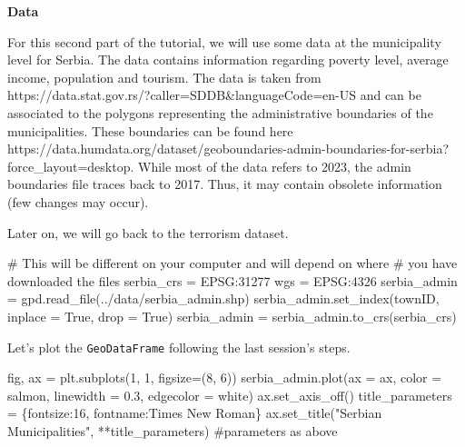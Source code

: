 \documentclass[
  letterpaper,
  DIV=11,
  numbers=noendperiod]{scrreprt}
\newenvironment{Shaded}{\begin{snugshade}}{\end{snugshade}}
\newcommand{\CommentTok}[1]{\textcolor[rgb]{0.37,0.37,0.37}{#1}}
\newcommand{\DecValTok}[1]{\textcolor[rgb]{0.68,0.00,0.00}{#1}}
\newcommand{\FloatTok}[1]{\textcolor[rgb]{0.68,0.00,0.00}{#1}}
\newcommand{\NormalTok}[1]{\textcolor[rgb]{0.00,0.23,0.31}{#1}}
\newcommand{\OperatorTok}[1]{\textcolor[rgb]{0.37,0.37,0.37}{#1}}
\newcommand{\StringTok}[1]{\textcolor[rgb]{0.13,0.47,0.30}{#1}}
\newcommand{\VariableTok}[1]{\textcolor[rgb]{0.07,0.07,0.07}{#1}}
\begin{document}
\textbf{Data}

For this second part of the tutorial, we will use some data at the
municipality level for Serbia. The data contains information regarding
poverty level, average income, population and tourism. The data is taken
from https://data.stat.gov.rs/?caller=SDDB\&languageCode=en-US and can
be associated to the polygons representing the administrative boundaries
of the municipalities. These boundaries can be found here
https://data.humdata.org/dataset/geoboundaries-admin-boundaries-for-serbia?force\_layout=desktop.
While most of the data refers to 2023, the admin boundaries file traces
back to 2017. Thus, it may contain obsolete information (few changes may
occur).

Later on, we will go back to the terrorism dataset.

\begin{Shaded}
\begin{Highlighting}[]
\CommentTok{\# This will be different on your computer and will depend on where}
\CommentTok{\# you have downloaded the files}
\NormalTok{serbia\_crs }\OperatorTok{=} \StringTok{\textquotesingle{}EPSG:31277\textquotesingle{}}
\NormalTok{wgs }\OperatorTok{=} \StringTok{\textquotesingle{}EPSG:4326\textquotesingle{}}
\NormalTok{serbia\_admin }\OperatorTok{=}\NormalTok{ gpd.read\_file(}\StringTok{\textquotesingle{}../data/serbia\_admin.shp\textquotesingle{}}\NormalTok{)}
\NormalTok{serbia\_admin.set\_index(}\StringTok{\textquotesingle{}townID\textquotesingle{}}\NormalTok{, inplace }\OperatorTok{=} \VariableTok{True}\NormalTok{, drop }\OperatorTok{=} \VariableTok{True}\NormalTok{)}
\NormalTok{serbia\_admin }\OperatorTok{=}\NormalTok{ serbia\_admin.to\_crs(serbia\_crs)}
\end{Highlighting}
\end{Shaded}

Let's plot the \texttt{GeoDataFrame} following the last session's steps.

\begin{Shaded}
\begin{Highlighting}[]
\NormalTok{fig, ax }\OperatorTok{=}\NormalTok{ plt.subplots(}\DecValTok{1}\NormalTok{, }\DecValTok{1}\NormalTok{, figsize}\OperatorTok{=}\NormalTok{(}\DecValTok{8}\NormalTok{, }\DecValTok{6}\NormalTok{))}
\NormalTok{serbia\_admin.plot(ax }\OperatorTok{=}\NormalTok{ ax, color }\OperatorTok{=} \StringTok{\textquotesingle{}salmon\textquotesingle{}}\NormalTok{, linewidth }\OperatorTok{=} \FloatTok{0.3}\NormalTok{, edgecolor }\OperatorTok{=} \StringTok{\textquotesingle{}white\textquotesingle{}}\NormalTok{)}
\NormalTok{ax.set\_axis\_off()}
\NormalTok{title\_parameters }\OperatorTok{=}\NormalTok{ \{}\StringTok{\textquotesingle{}fontsize\textquotesingle{}}\NormalTok{:}\StringTok{\textquotesingle{}16\textquotesingle{}}\NormalTok{, }\StringTok{\textquotesingle{}fontname\textquotesingle{}}\NormalTok{:}\StringTok{\textquotesingle{}Times New Roman\textquotesingle{}}\NormalTok{\}}
\NormalTok{ax.set\_title(}\StringTok{"Serbian Municipalities"}\NormalTok{, }\OperatorTok{**}\NormalTok{title\_parameters) }\CommentTok{\#parameters as above}
\end{Highlighting}
\end{Shaded}
\end{document}
